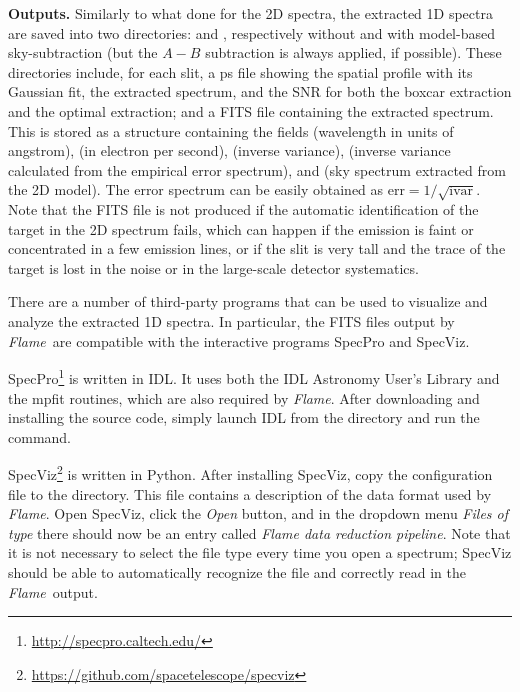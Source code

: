 \documentclass[a4paper]{article}
\newcommand{\flame}{\emph{Flame}}
\begin{document}
\begin{sloppypar}
\medskip
\noindent
\textbf{Outputs.} Similarly to what done for the 2D spectra, the extracted 1D spectra are saved into two directories:  and , respectively without and with model-based sky-subtraction (but the $A-B$ subtraction is always applied, if possible). These directories include, for each slit, a ps file showing the spatial profile with its Gaussian fit, the extracted spectrum, and the SNR for both the boxcar extraction and the optimal extraction; and a FITS file containing the extracted spectrum. This is stored as a structure containing the fields  (wavelength in units of angstrom),  (in electron per second),  (inverse variance),  (inverse variance calculated from the empirical error spectrum), and  (sky spectrum extracted from the 2D model). The error spectrum can be easily obtained as $\mathrm{err} = 1/\sqrt{\mathrm{ivar}}$. Note that the FITS file is not produced if the automatic identification of the target in the 2D spectrum fails, which can happen if the emission is faint or concentrated in a few emission lines, or if the slit is very tall and the trace of the target is lost in the noise or in the large-scale detector systematics.

There are a number of third-party programs that can be used to visualize and analyze the extracted 1D spectra. In particular, the FITS files output by \flame\ are compatible with the interactive programs SpecPro and SpecViz.

SpecPro\footnote{\url{http://specpro.caltech.edu/}} is written in IDL. It uses both the IDL Astronomy User's Library and the mpfit routines, which are also required by \flame. After downloading and installing the source code, simply launch IDL from the  directory and run the  command.

SpecViz\footnote{\url{https://github.com/spacetelescope/specviz}} is written in Python. After installing SpecViz, copy the configuration file  to the  directory. This file contains a description of the data format used by \flame. Open SpecViz, click the \emph{Open} button, and in the dropdown menu \emph{Files of type} there should now be an entry called \emph{Flame data reduction pipeline}. Note that it is not necessary to select the file type every time you open a spectrum; SpecViz should be able to automatically recognize the file and correctly read in the \flame\ output.



\end{sloppypar}
\end{document}
